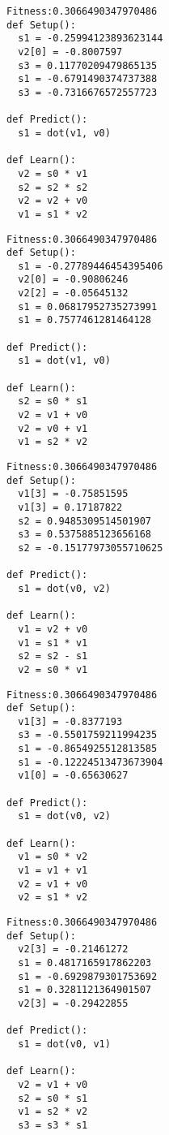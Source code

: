 \documentclass[twocolumn, a4j]{jarticle}
\begin{document}
\newpage

\begin{lstlisting}[caption= No. 5.11]
Fitness:0.3066490347970486 
def Setup():
  s1 = -0.25994123893623144
  v2[0] = -0.8007597
  s3 = 0.11770209479865135
  s1 = -0.6791490374737388
  s3 = -0.7316676572557723

def Predict():
  s1 = dot(v1, v0)

def Learn():
  v2 = s0 * v1
  s2 = s2 * s2
  v2 = v2 + v0
  v1 = s1 * v2

\end{lstlisting}

\begin{lstlisting}[caption= No. 5.12]
Fitness:0.3066490347970486 
def Setup():
  s1 = -0.27789446454395406
  v2[0] = -0.90806246
  v2[2] = -0.05645132
  s1 = 0.06817952735273991
  s1 = 0.7577461281464128

def Predict():
  s1 = dot(v1, v0)

def Learn():
  s2 = s0 * s1
  v2 = v1 + v0
  v2 = v0 + v1
  v1 = s2 * v2

\end{lstlisting}

\newpage

\begin{lstlisting}[caption= No. 5.13]
Fitness:0.3066490347970486 
def Setup():
  v1[3] = -0.75851595
  v1[3] = 0.17187822
  s2 = 0.9485309514501907
  s3 = 0.5375885123656168
  s2 = -0.15177973055710625

def Predict():
  s1 = dot(v0, v2)

def Learn():
  v1 = v2 + v0
  v1 = s1 * v1
  s2 = s2 - s1
  v2 = s0 * v1

\end{lstlisting}

\begin{lstlisting}[caption= No. 5.14]
Fitness:0.3066490347970486 
def Setup():
  v1[3] = -0.8377193
  s3 = -0.5501759211994235
  s1 = -0.8654925512813585
  s1 = -0.12224513473673904
  v1[0] = -0.65630627

def Predict():
  s1 = dot(v0, v2)

def Learn():
  v1 = s0 * v2
  v1 = v1 + v1
  v2 = v1 + v0
  v2 = s1 * v2

\end{lstlisting}

\newpage

\begin{lstlisting}[caption= No. 5.15]
Fitness:0.3066490347970486 
def Setup():
  v2[3] = -0.21461272
  s1 = 0.4817165917862203
  s1 = -0.6929879301753692
  s1 = 0.3281121364901507
  v2[3] = -0.29422855

def Predict():
  s1 = dot(v0, v1)

def Learn():
  v2 = v1 + v0
  s2 = s0 * s1
  v1 = s2 * v2
  s3 = s3 * s1

\end{lstlisting}
\end{document}
